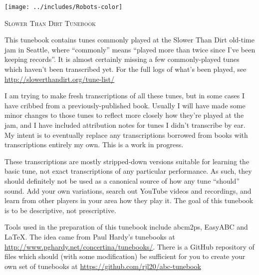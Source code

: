 \begin{titlepage}
\begin{center}

\texttt{[image: ../includes/Robots-color]}

\vspace{1cm}

\textsc{\Large Slower Than Dirt Tunebook}\\[0.5cm]


\begin{minipage}{6in}
\setlength{\parindent}{15pt} %
\setlength{\parskip}{1em plus.4em minus.3em}



This tunebook contains tunes commonly played at the Slower Than Dirt 
old-time jam in Seattle, where ``commonly'' means ``played more than twice
since I've been keeping records''. It is almost certainly missing a few
commonly-played tunes which haven't been transcribed yet. For the full logs
of what's been played, see \url{http://slowerthandirt.org/tune-list/}

I am trying to make fresh transcriptions of all these tunes, but in some 
cases I have cribbed from a previously-published book. Usually I will have
made some minor changes to those tunes to reflect more closely how they're
played at the jam, and I have included attribution notes for tunes I didn't
transcribe by ear. My intent is to eventually replace any transcriptions 
borrowed from books with transcriptions entirely my own. This is a work
in progress.

These transcriptions are mostly stripped-down versions suitable for learning
the basic tune, not exact transcriptions of any particular performance. As
such, they should definitely not be used as a canonical source of how any 
tune ``should'' sound. Add your own variations, search out YouTube videos and
recordings, and learn from other players in your area how they play it. The
goal of this tunebook is to be descriptive, not prescriptive.

Tools used in the preparation of this tunebook include abcm2ps,
EasyABC and {\LaTeX}. The idea came from Paul Hardy's tunebooks at
\url{http://www.pghardy.net/concertina/tunebooks/}.  There is a GitHub
repository of files which should (with some modification) be
sufficient for you to create your own set of tunebooks at
\url{https://github.com/rjl20/abc-tunebook}


\end{minipage}
\end{center}
\end{titlepage}
